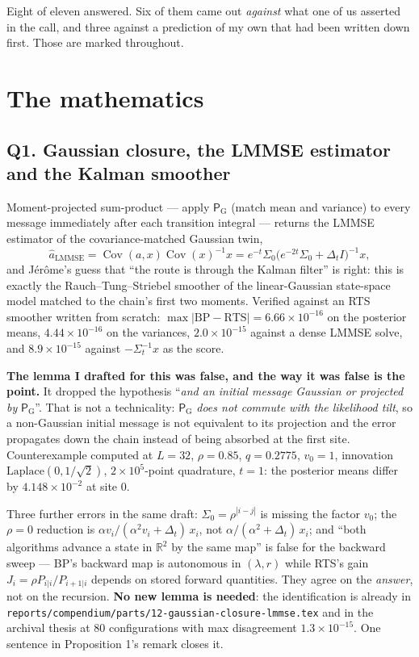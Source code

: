 \documentclass[10pt,a4paper]{article}
\newcommand{\corr}{\rho}
\newcommand{\nsites}{L}
\newcommand{\Dt}{\Delta_t}
\newcommand{\Pg}{\mathsf{P}_{\mathrm{G}}}
\newcommand{\code}[1]{\texttt{\small #1}}
\newcommand{\st}[1]{\textbf{#1}}
\begin{document}
\medskip
\noindent Eight of eleven answered. Six of them came out \emph{against} what one of us
asserted in the call, and three against a prediction of my own that had been written down
first. Those are marked throughout.

\section{The mathematics}

\subsection{Q1. Gaussian closure, the LMMSE estimator and the Kalman smoother}

Moment-projected sum-product --- apply $\Pg$ (match mean and variance) to every message
immediately after each transition integral --- returns the LMMSE estimator of the
covariance-matched Gaussian twin,
\[
\hat a_{\mathrm{LMMSE}}
= \operatorname{Cov}(a,x)\operatorname{Cov}(x)^{-1}x
= e^{-t}\Sigma_0\bigl(e^{-2t}\Sigma_0 + \Dt I\bigr)^{-1}x ,
\]
and Jérôme's guess that ``the route is through the Kalman filter'' is right: this is exactly
the Rauch--Tung--Striebel smoother of the linear-Gaussian state-space model matched to the
chain's first two moments. Verified against an RTS smoother written from scratch:
$\max|\mathrm{BP}-\mathrm{RTS}| = 6.66\times10^{-16}$ on the posterior means,
$4.44\times10^{-16}$ on the variances, $2.0\times10^{-15}$ against a dense LMMSE solve, and
$8.9\times10^{-15}$ against $-\Sigma_t^{-1}x$ as the score.

\st{The lemma I drafted for this was false, and the way it was false is the point.} It dropped
the hypothesis ``\emph{and an initial message Gaussian or projected by} $\Pg$''. That is not a
technicality: $\Pg$ \emph{does not commute with the likelihood tilt}, so a non-Gaussian initial
message is not equivalent to its projection and the error propagates down the chain instead of
being absorbed at the first site. Counterexample computed at $\nsites=32$, $\corr=0.85$,
$q=0.2775$, $v_0=1$, innovation $\mathrm{Laplace}(0,1/\sqrt2)$, $2\times10^5$-point quadrature,
$t=1$: the posterior means differ by $4.148\times10^{-2}$ at site 0.

Three further errors in the same draft: $\Sigma_0 = \corr^{|i-j|}$ is missing the factor $v_0$;
the $\corr=0$ reduction is $\alpha v_i/(\alpha^2 v_i + \Dt)\,x_i$, not
$\alpha/(\alpha^2+\Dt)\,x_i$; and ``both algorithms advance a state in $\mathbb{R}^2$ by the
same map'' is false for the backward sweep --- BP's backward map is autonomous in
$(\lambda,r)$ while RTS's gain $J_i = \corr P_{i|i}/P_{i+1|i}$ depends on stored forward
quantities. They agree on the \emph{answer}, not on the recursion. \st{No new lemma is needed}:
the identification is already in \code{reports/compendium/parts/12-gaussian-closure-lmmse.tex}
and in the archival thesis at 80 configurations with max disagreement $1.3\times10^{-15}$. One
sentence in Proposition 1's remark closes it.
\end{document}
